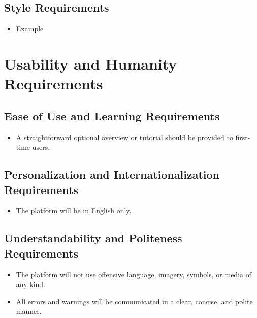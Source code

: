 \documentclass[12pt]{article}
\begin{document}
  \subsection{Style Requirements}
    \begin{itemize}
      \item Example
    \end{itemize}

\section{Usability and Humanity Requirements}
  \subsection{Ease of Use and Learning Requirements}
    \begin{itemize}
      \item A straightforward optional overview or tutorial should be provided to first-time users.
    \end{itemize}

  \subsection{Personalization and Internationalization Requirements}
    \begin{itemize}
      \item The platform will be in English only.
    \end{itemize}

  \subsection{Understandability and Politeness Requirements}
    \begin{itemize}
      \item The platform will not use offensive language, imagery, symbols, or media of any kind.
      \item All errors and warnings will be communicated in a clear, concise, and polite manner.
    \end{itemize}
\end{document}
